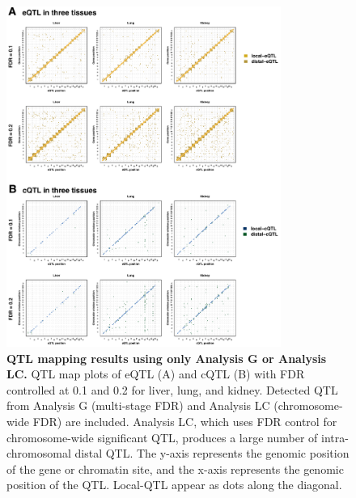 \documentclass[9pt,twocolumn,twoside]{gsajnl}
\begin{document}
\begin{figure}[h]
\renewcommand{\familydefault}{\sfdefault}\normalfont
\centering
\includegraphics[width=0.8\textwidth, trim={0in 0in 0in 0in}, clip]{figs/qtl_map_supplemental.pdf}
\caption{\textbf{QTL mapping results using only Analysis G or Analysis LC.} QTL map plots of eQTL (A) and cQTL (B) with FDR controlled at 0.1 and 0.2 for liver, lung, and kidney. Detected QTL from Analysis G (multi-stage FDR) and Analysis LC (chromosome-wide FDR) are included. Analysis LC, which uses FDR control for chromosome-wide significant QTL, produces a large number of intra-chromosomal distal QTL. The y-axis represents the genomic position of the gene or chromatin site, and the x-axis represents the genomic position of the QTL. Local-QTL appear as dots along the diagonal.
\label{fig:grid_fdr_plot}}
\end{figure}
\end{document}
